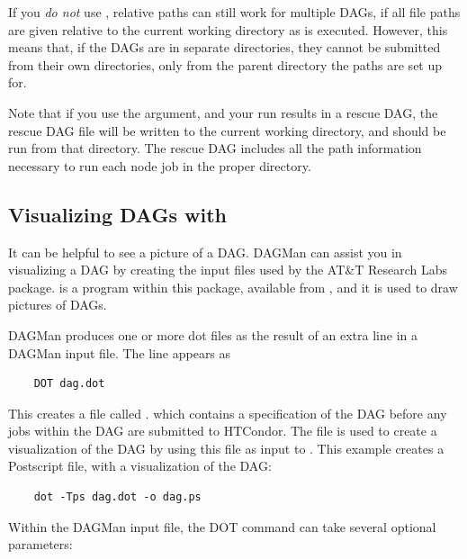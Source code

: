 If you \emph{do not} use , relative paths can still work
for multiple DAGs, if
all file paths are given relative to
the current working directory as  is executed.
However, this means that, if the DAGs are in separate directories, they
cannot be submitted from their own directories, only from the parent
directory the paths are set up for.

Note that if you use the  argument, and your run
results in a rescue DAG, the rescue DAG file will be written to
the current working directory, and should be run from that directory.
The rescue DAG includes all the path information necessary to
run each node job in the proper directory.


\subsection{Visualizing DAGs with }

It can be helpful to see a picture of a DAG.
DAGMan can assist you in visualizing a DAG by creating
the input files used by the AT\&T Research Labs 
 package. 
 is a program within this package,
available from ,
and it is used to draw pictures of DAGs. 

DAGMan produces one or more dot files as the result of
an extra line
in a DAGMan input file. 
The line appears as
\begin{verbatim}
    DOT dag.dot
\end{verbatim}

This creates a file called .
which contains
a specification of the DAG before any jobs within the DAG
are submitted to HTCondor.
The  file is used to create a visualization
of the DAG by using this file as input to .
This example creates a Postscript file, with a visualization of the DAG:

\begin{verbatim}
    dot -Tps dag.dot -o dag.ps
\end{verbatim}

Within the DAGMan input file,
the DOT command can take several optional parameters:

